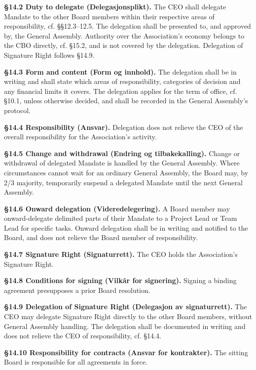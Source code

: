\documentclass{../../../Common/Latex/Templates/rapport}
\begin{document}
\textbf{\S 14.2 Duty to delegate (Delegasjonsplikt).} The CEO shall delegate Mandate to the other Board members within their respective areas of responsibility, cf. \S\S12.3--12.5. The delegation shall be presented to, and approved by, the General Assembly. Authority over the Association's economy belongs to the CBO directly, cf. \S15.2, and is not covered by the delegation. Delegation of Signature Right follows \S14.9.

\textbf{\S 14.3 Form and content (Form og innhold).} The delegation shall be in writing and shall state which areas of responsibility, categories of decision and any financial limits it covers. The delegation applies for the term of office, cf. \S10.1, unless otherwise decided, and shall be recorded in the General Assembly's protocol.

\textbf{\S 14.4 Responsibility (Ansvar).} Delegation does not relieve the CEO of the overall responsibility for the Association's activity.

\textbf{\S 14.5 Change and withdrawal (Endring og tilbakekalling).} Change or withdrawal of delegated Mandate is handled by the General Assembly. Where circumstances cannot wait for an ordinary General Assembly, the Board may, by 2/3 majority, temporarily suspend a delegated Mandate until the next General Assembly.

\textbf{\S 14.6 Onward delegation (Videredelegering).} A Board member may onward-delegate delimited parts of their Mandate to a Project Lead or Team Lead for specific tasks. Onward delegation shall be in writing and notified to the Board, and does not relieve the Board member of responsibility.

\textbf{\S 14.7 Signature Right (Signaturrett).} The CEO holds the Association's Signature Right.

\textbf{\S 14.8 Conditions for signing (Vilkår for signering).} Signing a binding agreement presupposes a prior Board resolution.

\textbf{\S 14.9 Delegation of Signature Right (Delegasjon av signaturrett).} The CEO may delegate Signature Right directly to the other Board members, without General Assembly handling. The delegation shall be documented in writing and does not relieve the CEO of responsibility, cf. \S14.4.

\textbf{\S 14.10 Responsibility for contracts (Ansvar for kontrakter).} The sitting Board is responsible for all agreements in force.

\end{document}
